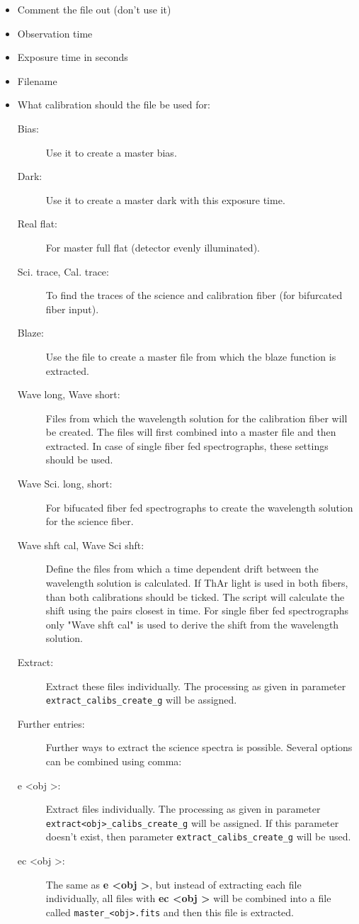 \documentclass[10pt,a4paper]{article}
\begin{document}
\begin{itemize}\setlength\itemsep{0em}
  \item Comment the file out (don't use it)
  \item Observation time
  \item Exposure time in seconds
  \item Filename
  \item What calibration should the file be used for:
    \begin{description}
      \item[Bias:] Use it to create a master bias.
      \item[Dark:] Use it to create a master dark with this exposure time.
      \item[Real flat:] For master full flat (detector evenly illuminated).
      \item[Sci. trace, Cal. trace:] To find the traces of the science and calibration fiber (for bifurcated fiber input).
      \item[Blaze:] Use the file to create a master file from which the blaze function is extracted.
      \item[Wave long, Wave short:] Files from which the wavelength solution for the calibration fiber will be created. The files will first combined into a master file and then extracted. In case of single fiber fed spectrographs, these settings should be used.
      \item[Wave Sci. long, short:] For bifucated fiber fed spectrographs to create the wavelength solution for the science fiber.
      \item[Wave shft cal, Wave Sci shft:] Define the files from which a time dependent drift between the wavelength solution is calculated. If ThAr light is used in both fibers, than both calibrations should be ticked. The script will calculate the shift using the pairs closest in time. For single fiber fed spectrographs only "Wave shft cal" is used to derive the shift from the wavelength solution.
      \item[Extract:] Extract these files individually. The processing as given in parameter \verb|extract_calibs_create_g| will be assigned.
      \item[Further entries:] Further ways to extract the science spectra is possible. Several options can be combined using comma:
      \item[e \textless obj \textgreater :] Extract files individually. The processing as given in parameter \verb|extract<obj>_calibs_create_g| will be assigned. If this parameter doesn't exist, then parameter \verb|extract_calibs_create_g| will be used.
      \item[ec \textless obj \textgreater :] The same as \textbf{e \textless obj \textgreater}, but instead of extracting each file individually, all files with \textbf{ec \textless obj \textgreater} will be combined into a file called \verb|master_<obj>.fits| and then this file is extracted.
    \end{description}
\end{itemize}
\end{document}
